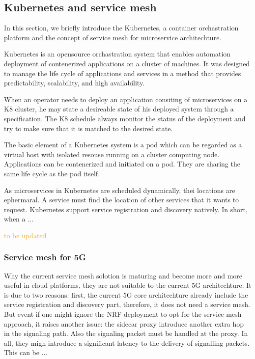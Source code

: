 \documentclass[a4paper]{article}
\begin{document}
\subsection{Kubernetes and service mesh}

In this section, we briefly introduce the Kubernetes, a container orchastration platform and the concept of service mesh for microservice architechture.

Kubernetes is an opensource orchastration system that enables automation deployment of contenerized applications on a cluster of machines. It was designed to manage the life cycle of applications and services in a method that provides predictability, scalability, and high availability.

When an operator needs to deploy an application consiting of microservices on a K8 cluster, he may state a desireable state of his deployed system through a specification. The K8 schedule always monitor the status of the deployment and try to make sure that it is matched to the desired state.

The basic element of a Kubernetes system is a pod which can be regarded as a virtual host with isolated resouse running on a cluster computing node. Applications can be contenerized and initiated on a pod. They are sharing the same life cycle as the pod itself.


As microservices in Kubernetes are scheduled dynamically, thei locations are ephermaral. A service must find the location of other services that it wants to request. Kubernetes support service registration and discovery natively. In short, when a ...

\textcolor{orange}{to be updated}
\subsubsection{Service mesh for 5G}

Why the current service mesh solotion is maturing and become more and more useful in cloud platforms, they are not suitable to the current 5G architechture. It is due to two reasons: first, the current 5G core architechture already include the service registration and discovery part, therefore, it does not need a service mesh. But event if one might ignore the NRF deployment to opt for the service mesh approach, it raises another issue: the sidecar proxy introduce another extra hop in the signaling path. Also the signaling packet must be handled at the proxy. In all, they migh introduce a significant latency to the delivery of signalling packets. This can be ...
\end{document}
